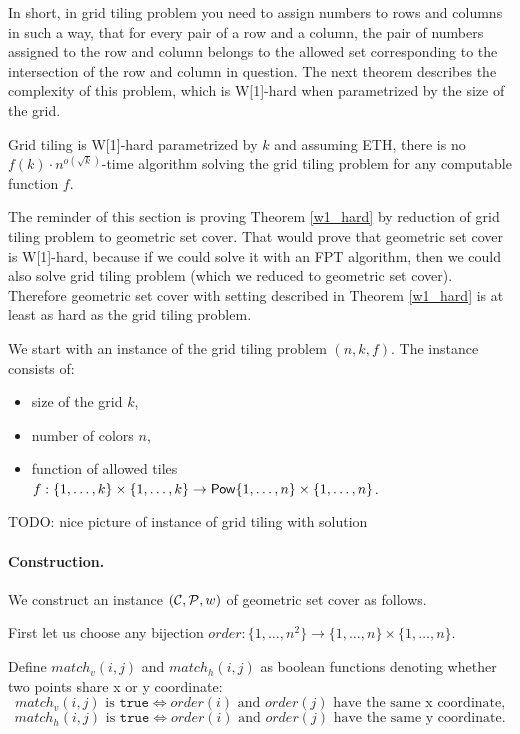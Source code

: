 In short, in grid tiling problem you need to assign numbers
to rows and columns in such a way,
that for every pair of a row and a column,
the pair of numbers assigned
to the row and column 
belongs to the allowed set corresponding to the intersection
of the row and column in question.
The next theorem describes the complexity of this problem,
which is W[1]-hard when parametrized by the size of the grid.

\begin{tw}
\label{grid_tiling_w1_hard}
\textbf{\cite{marx_grid_tiling}}
Grid tiling is W[1]-hard parametrized by $k$ and
assuming ETH, there is no $f(k)\cdot n^{o(\sqrt{k})}$-time
algorithm solving the grid tiling problem
for any computable function $f$.
\end{tw}

The reminder of this section is proving Theorem \ref{w1_hard}
by reduction of grid tiling problem to geometric set cover.
That would prove that geometric set cover is W[1]-hard,
because if we could solve it with an FPT algorithm,
then we could also solve grid tiling problem
(which we reduced to geometric set cover).
Therefore geometric set cover with setting
described in Theorem \ref{w1_hard}
is at least as hard as the grid tiling problem.

We start with an instance of the grid tiling problem $(n, k, f)$.
The instance consists of:
\begin{itemize}
\item size of the grid $k$,
\item number of colors $n$,
\item function of allowed tiles
$f : \{1, \ldots, k\} \times \{1, \ldots, k\} \rightarrow \mathsf{Pow}\{1, \ldots, n\} \times \{1, \ldots, n\}$.
\end{itemize}

TODO: nice picture of instance of grid tiling with solution

\paragraph{Construction.}
We construct an instance $(\mathcal{C}, \mathcal{P}, w)$ of geometric set cover as follows.

First let us choose any bijection
$order : \{1, \ldots, n^2\} \rightarrow \{1, \ldots, n\} \times \{1, \ldots, n\}$.


Define $match_v(i, j)$ and $match_h(i, j)$
as boolean functions denoting whether two points share x or y coordinate:
$$match_v(i, j) \text{ is } \texttt{true} \iff
order(i) \text{ and } order(j) \text{ have the same x coordinate,}$$
$$match_h(i, j) \text{ is } \texttt{true} \iff
order(i) \text{ and } order(j) \text{ have the same y coordinate.}$$


